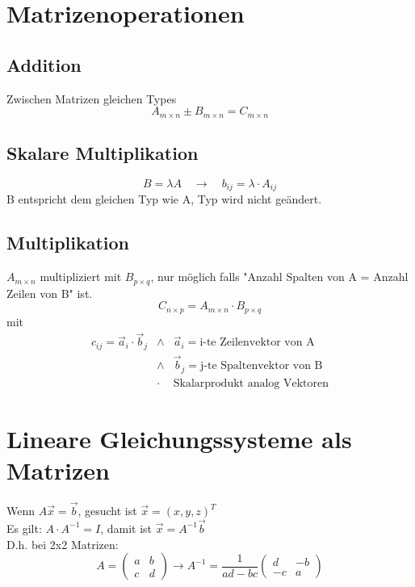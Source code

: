 \documentclass{report}
\begin{document}
\section{Matrizenoperationen}
\subsection{Addition}
Zwischen Matrizen gleichen Types
\begin{equation}A_{m \times n} \pm B_{m \times n} = C_{m \times n}\end{equation}
\subsection{Skalare Multiplikation}
\begin{equation}B = \lambda A \quad \to \quad b_{ij} = \lambda \cdot A_{ij}\end{equation}
B entspricht dem gleichen Typ wie A, Typ wird nicht geändert.
\subsection{Multiplikation}
$A_{m \times n}$ multipliziert mit $B_{p \times q}$, nur möglich falls "Anzahl Spalten von A = Anzahl Zeilen von B" ist.
\begin{equation}C_{n \times p} = A_{m \times n} \cdot B_{p \times q}\end{equation}
mit
\begin{eqnarray}c_{ij} = \vec{a}_i \cdot \vec{b}_j & \land & \vec{a}_i = \mbox{i-te Zeilenvektor von A}\\
& \land & \vec{b}_j = \mbox{j-te Spaltenvektor von B}\\
& \cdot & \mbox{Skalarprodukt analog Vektoren}\end{eqnarray}
\section{Lineare Gleichungssysteme als Matrizen}
Wenn $A\vec{x} = \vec{b}$, gesucht ist $\vec{x} = (x,y,z)^T$\\
Es gilt: $A \cdot A^{-1} = I$, damit ist $\vec{x} = A^{-1} \vec{b}$\\
D.h. bei 2x2 Matrizen:
\begin{equation}A = \left(\begin{matrix}a & b\\c & d\end{matrix}\right) \to A^{-1} = \frac{1}{ad -bc}\left(\begin{matrix}d & -b\\-c & a\end{matrix}\right)\end{equation}
\end{document}
